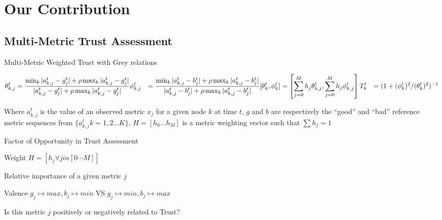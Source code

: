 \documentclass[aspectratio=169]{beamer}
\let\\\space
\begin{document}
\section{Our Contribution}

\subsection{Multi-Metric Trust Assessment}


\begin{frame}{Multi-Metric Weighted Trust with Grey relations}

  \begin{align}
    \theta_{k,j}^t &= \frac{\min_k|a_{k,j}^t - g_j^t| + \rho \max_k|a_{k,j}^t-g_j^t|}{|a_{k,j}^t-g_j^t| + \rho \max_k|a_{k,j}^t-g_j^t|} \\
    \phi_{k,j}^t &= \frac{\min_k|a_{k,j}^t - b_j^t| + \rho \max_k|a_{k,j}^t-b_j^t|}{|a_{k,j}^t-b_j^t| + \rho \max_k|a_{k,j}^t-b_j^t|} \\
    [\theta_k^t, \phi_k^t] &= \left[\sum_{j=0}^M h_j \theta_{k,j}^t,\sum_{j=0}^M h_j \phi_{k,j}^t \right] \\
    T_k^t &= ({1+{(\phi_k^t)^2}/{(\theta_k^t)^2}})^{-1} 
  \end{align}

  Where  $a_{k,j}^t$ is the value of an observed metric $x_j$ for a given node $k$ at time $t$,  $g$ and $b$ are respectively the ``good'' and ``bad'' reference metric sequences from $\{a_{k,j}^t k=1,2\dots K\}$, $H=[h_0\dots h_M]$ is a metric weighting vector such that $\sum h_j = 1$
\end{frame}

\begin{frame}{Factor of Opportunity in Trust Assessment}
  \begin{block}{Weight}
    $H = [h_j \forall j in [0\cdots M]]$

    Relative importance of a given metric $j$
  \end{block}

  \begin{block}{Valence}
    $g_j \mapsto max , b_j \mapsto min $ VS
    $g_j \mapsto min , b_j \mapsto max $

    Is this metric $j$ positively or negatively related to Trust? 
  \end{block}


\end{frame}
\end{document}
